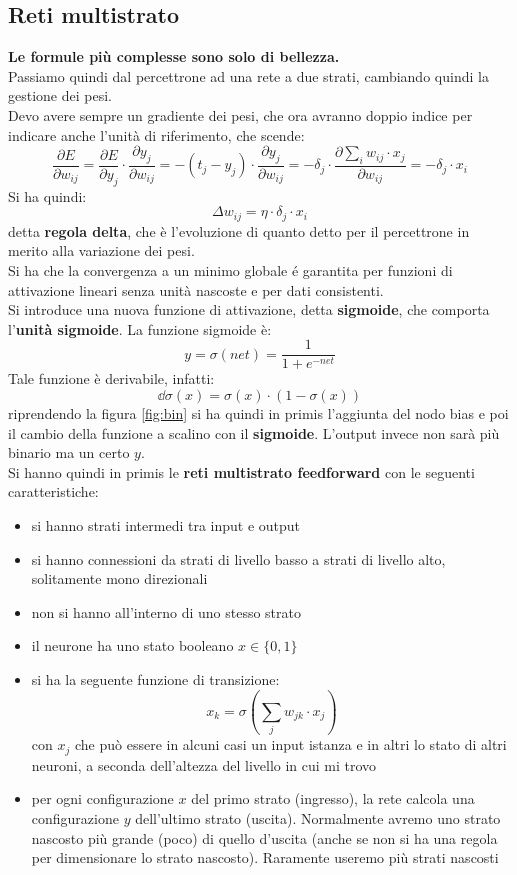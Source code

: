 \documentclass[a4paper,12pt, oneside]{book}
\begin{document}
\subsection{Reti multistrato}
\textbf{Le formule più complesse sono solo di bellezza.}\\
\noindent
Passiamo quindi dal percettrone ad una rete a due strati, cambiando quindi la
gestione dei pesi.\\
Devo avere sempre un gradiente dei pesi, che ora avranno doppio indice per
indicare anche l'unità di riferimento, che scende:
\[\frac{\partial E}{\partial w_{ij}}=\frac{\partial E}{\partial y_{j}}\cdot
  \frac{\partial y_j}{\partial w_{ij}}=-(t_j-y_j)\cdot \frac{\partial
    y_j}{\partial w_{ij}}=-\delta_j\cdot\frac{\partial \sum_i w_{ij}\cdot
    x_j}{\partial w_{ij}}=-\delta_j\cdot x_i\]
Si ha quindi:
\[\Delta w_{ij}=\eta\cdot \delta_j\cdot x_i\]
detta \textbf{regola delta}, che è l'evoluzione di quanto detto per il
percettrone in merito alla variazione dei pesi.\\
Si ha che la convergenza a un minimo globale é garantita per funzioni di
attivazione lineari senza unità nascoste e per dati consistenti.\\
Si introduce una nuova funzione di attivazione, detta \textbf{sigmoide}, che
comporta l'\textbf{unità sigmoide}. La funzione sigmoide è:
\[y=\sigma(net)=\frac{1}{1+e^{-net}}\]
Tale funzione è derivabile, infatti:
\[\dd \sigma(x)=\sigma(x)\cdot (1-\sigma(x))\]
riprendendo la figura \ref{fig:bin} si ha quindi in primis l'aggiunta del nodo
bias e poi il cambio della funzione a scalino con il \textbf{sigmoide}. L'output
invece non sarà più binario ma un certo $y$.\\
Si hanno quindi in primis le \textbf{reti multistrato feedforward} con le
seguenti caratteristiche:
\begin{itemize}
  \item si hanno strati intermedi tra input e output
  \item si hanno connessioni da strati di livello basso a strati di livello
  alto, solitamente mono direzionali
  \item non si hanno all'interno di uno stesso strato
  \item il neurone ha uno stato booleano $x\in\{0,1\}$
  \item si ha la seguente funzione di transizione:
  \[x_k=\sigma\left(\sum_{j}w_{jk}\cdot x_j\right)\]
  con $x_j$ che può essere in alcuni
  casi un input istanza e in altri lo stato di altri neuroni, a seconda
  dell'altezza del livello in cui mi trovo
  \item per ogni configurazione $x$ del primo strato (ingresso), la rete calcola
  una configurazione $y$ dell'ultimo strato (uscita). Normalmente avremo uno
  strato nascosto più grande (poco) di quello d'uscita (anche se non si ha una
  regola per dimensionare lo strato nascosto). Raramente useremo più strati
  nascosti
\end{itemize}
\end{document}
